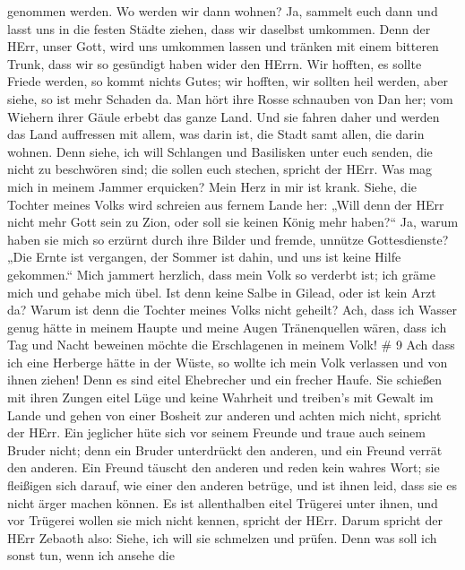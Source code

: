 genommen werden.  Wo werden wir dann wohnen? Ja, sammelt
euch dann und lasst uns in die festen Städte ziehen, dass wir daselbst
umkommen. Denn der HErr, unser Gott, wird uns umkommen lassen und
tränken mit einem bitteren Trunk, dass wir so gesündigt haben wider den
HErrn.  Wir hofften, es sollte Friede werden, so kommt
nichts Gutes; wir hofften, wir sollten heil werden, aber siehe, so ist
mehr Schaden da.  Man hört ihre Rosse schnauben von Dan
her; vom Wiehern ihrer Gäule erbebt das ganze Land. Und sie fahren daher
und werden das Land auffressen mit allem, was darin ist, die Stadt samt
allen, die darin wohnen.  Denn siehe, ich will Schlangen
und Basilisken unter euch senden, die nicht zu beschwören sind; die
sollen euch stechen, spricht der HErr.  Was mag mich in
meinem Jammer erquicken? Mein Herz in mir ist krank. 
Siehe, die Tochter meines Volks wird schreien aus fernem Lande her:
„Will denn der HErr nicht mehr Gott sein zu Zion, oder soll sie keinen
König mehr haben?{}`` Ja, warum haben sie mich so erzürnt durch ihre
Bilder und fremde, unnütze Gottesdienste?  „Die Ernte ist
vergangen, der Sommer ist dahin, und uns ist keine Hilfe gekommen.``
 Mich jammert herzlich, dass mein Volk so verderbt ist; ich
gräme mich und gehabe mich übel.  Ist denn keine Salbe in
Gilead, oder ist kein Arzt da? Warum ist denn die Tochter meines Volks
nicht geheilt?  Ach, dass ich Wasser genug hätte in meinem
Haupte und meine Augen Tränenquellen wären, dass ich Tag und Nacht
beweinen möchte die Erschlagenen in meinem Volk! \# 9  Ach
dass ich eine Herberge hätte in der Wüste, so wollte ich mein Volk
verlassen und von ihnen ziehen! Denn es sind eitel Ehebrecher und ein
frecher Haufe.  Sie schießen mit ihren Zungen eitel Lüge und
keine Wahrheit und treiben's mit Gewalt im Lande und gehen von einer
Bosheit zur anderen und achten mich nicht, spricht der HErr.
 Ein jeglicher hüte sich vor seinem Freunde und traue auch
seinem Bruder nicht; denn ein Bruder unterdrückt den anderen, und ein
Freund verrät den anderen.  Ein Freund täuscht den anderen
und reden kein wahres Wort; sie fleißigen sich darauf, wie einer den
anderen betrüge, und ist ihnen leid, dass sie es nicht ärger machen
können.  Es ist allenthalben eitel Trügerei unter ihnen, und
vor Trügerei wollen sie mich nicht kennen, spricht der HErr.
 Darum spricht der HErr Zebaoth also: Siehe, ich will sie
schmelzen und prüfen. Denn was soll ich sonst tun, wenn ich ansehe die
